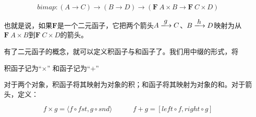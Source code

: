 \documentclass[b5paper]{ctexart}
\begin{document}
\[
bimap : (A \to C) \to (B \to D) \to (\mathbf{F}\ A \times B \to \mathbf{F}\ C \times D)
\]

也就是说，如果$\mathbf{F}$是一个二元函子，它把两个箭头$A \arrowto{g} C$、$B \arrowto{h} D$映射为从$\mathbf{F}\ A \times B$到$\mathbf{F}\ C \times D$的箭头。

有了二元函子的概念，就可以定义积函子与和函子了。我们用中缀的形式，将

\begin{center}
积函子记为“$\times$” \quad \quad \quad 和函子记为“$+$”
\end{center}

对于两个对象，积函子将其映射为对象的积；和函子将其映射为对象的和。对于箭头，定义：

\[
f \times g = \langle f \circ fst, g \circ snd \rangle
\quad \quad \quad
f + g = [left \circ f, right \circ g]
\]
\end{document}
